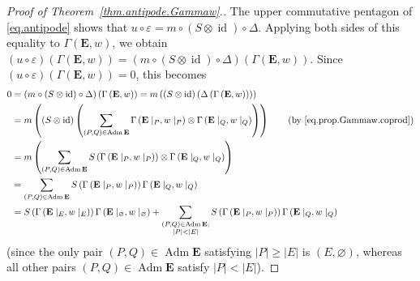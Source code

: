 \documentclass[12pt]{article}
\theoremstyle{plain}
\theoremstyle{definition}
\theoremstyle{remark}
\let\sumnonlimits\sum
\renewcommand{\sum}{\sumnonlimits\limits}
\newcommand{\id}{{\operatorname{id}}}
\newcommand{\Adm}{\operatorname{Adm}}
\newcommand{\EE}{{\mathbf{E}}}
\begin{document}
\begin{proof}[Proof of Theorem~\ref{thm.antipode.Gammaw}.]
The upper commutative pentagon of \eqref{eq.antipode} shows that
$u \circ \varepsilon = m \circ \left(S \otimes \id\right) \circ
\Delta$. Applying both sides of this equality to
$\Gamma\left(\EE, w\right)$, we obtain
$\left(u \circ \varepsilon\right)
\left(\Gamma\left(\EE, w\right)\right)
= \left(m \circ \left(S \otimes \id\right) \circ
\Delta\right) \left(\Gamma\left(\EE, w\right)\right)$.
Since
$\left(u \circ \varepsilon\right)
\left(\Gamma\left(\EE, w\right)\right) = 0$, this
becomes
\begin{align}
0
&= \left(m \circ \left(S \otimes \id\right) \circ
\Delta\right) \left(\Gamma\left(\EE, w\right)\right)
= m \left(\left(S \otimes \id\right) \left(
\Delta \left(\Gamma\left(\EE, w\right)\right)\right)\right)
\nonumber\\
&= m \left(\left(S \otimes \id\right) \left(
\sum_{\left(P, Q\right) \in \Adm \EE}
\Gamma\left(\EE\mid_P, w\mid_P\right)
\otimes \Gamma\left(\EE\mid_Q, w\mid_Q\right) \right) \right)
\qquad \left(\text{by \eqref{eq.prop.Gammaw.coprod}}\right)
\nonumber\\
&= m \left(\sum_{\left(P, Q\right) \in \Adm \EE}
S\left(\Gamma\left(\EE\mid_P, w\mid_P\right)\right)
\otimes
\Gamma\left(\EE\mid_Q, w\mid_Q\right)\right)
\nonumber\\
&= \sum_{\left(P, Q\right) \in \Adm \EE}
S\left(\Gamma\left(\EE\mid_P, w\mid_P\right)\right)
\Gamma\left(\EE\mid_Q, w\mid_Q\right)
\nonumber \\
&= S \left(\Gamma\left(\EE\mid_E, w\mid_E\right)\right)
\Gamma\left(\EE\mid_\varnothing, w\mid_\varnothing\right)
+ \sum_{\substack{\left(P, Q\right) \in \Adm \EE ; \\
                  \left|P\right| < \left|E\right|}}
S\left(\Gamma\left(\EE\mid_P, w\mid_P\right)\right)
\Gamma\left(\EE\mid_Q, w\mid_Q\right)
\label{pf.thm.antipode.Gammaw.Req.1}
\end{align}
(since the only pair $\left(P, Q\right) \in \Adm \EE$ satisfying
$\left|P\right| \geq \left|E\right|$ is $\left(E, \varnothing\right)$,
whereas all other pairs $\left(P, Q\right) \in \Adm \EE$
satisfy $\left|P\right| < \left|E\right|$).


\end{proof}
\end{document}
